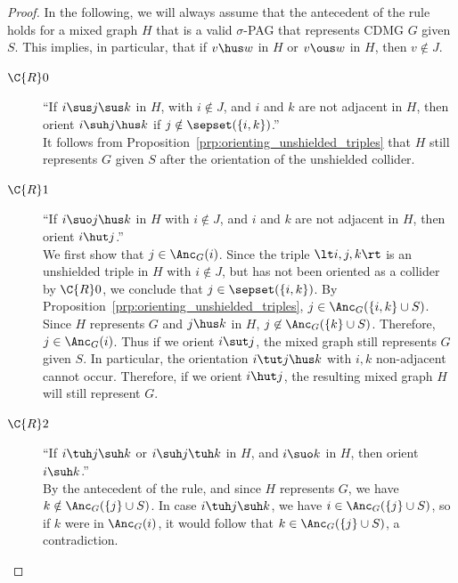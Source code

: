 \begin{proof}
  In the following, we will always assume that the antecedent of the rule holds for a mixed graph $H$ that is a valid $\sigma$-PAG that represents CDMG $G$ given $S$.
  This implies, in particular, that if $v \hus w$ in $H$ or $v \ous w$ in $H$, then $v \notin J$.
  \begin{description}
    \item[$\C{R}0$] ``If $i \sus j \sus k$ in $H$, with $i \notin J$, and $i$ and $k$ are not adjacent in $H$, then orient $i \suh j \hus k$ if $j \notin \sepset(\{i,k\})$.''\\ %
      It follows from Proposition~\ref{prp:orienting_unshielded_triples} that $H$ still represents $G$ given $S$ after the orientation of the unshielded collider.
    \item[$\C{R}1$] ``If $i \suo j \hus k$ in $H$ with $i \notin J$, and $i$ and $k$ are not adjacent in $H$, then orient $i \hut j$.''\\
      We first show that $j \in \Anc_G(i)$.
      Since the triple $\lt i, j, k \rt$ is an unshielded triple in $H$ with $i \notin J$, but has not been oriented as a collider by $\C{R}0$, we conclude that $j \in \sepset(\{i,k\})$. %
      By Proposition~\ref{prp:orienting_unshielded_triples}, $j \in \Anc_G(\{i,k\} \cup S)$.
      Since $H$ represents $G$ and $j \hus k$ in $H$, $j \not\in \Anc_G(\{k\}\cup S)$. 
      Therefore, $j \in \Anc_G(i)$.
      Thus if we orient $i \sut j$, the mixed graph still represents $G$ given $S$.
      In particular, the orientation $i \tut j \hus k$ with $i, k$ non-adjacent cannot occur.
      Therefore, if we orient $i \hut j$, the resulting mixed graph $H$ will still represent $G$.
    \item[$\C{R}2$] ``If $i \tuh j \suh k$ or $i \suh j \tuh k$ in $H$, and $i \suo k$ in $H$, then orient $i \suh k$.''\\
      By the antecedent of the rule, and since $H$ represents $G$, we have $k \notin \Anc_G(\{j\} \cup S)$.
      In case $i \tuh j \suh k$, we have $i \in \Anc_G(\{j\} \cup S)$, so if $k$ were in $\Anc_G(i)$, it would follow that $k \in \Anc_G(\{j\}\cup S)$, a contradiction.

\end{description}
\end{proof}
